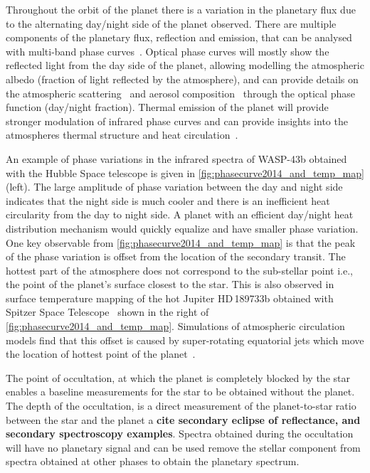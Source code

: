 Throughout the orbit of the planet there is a variation in the planetary flux due to the alternating day/night side of the planet observed.
There are multiple components of the planetary flux, reflection and emission, that can be analysed with multi-band phase curves~\citep[e.g.][]{knutson_characterizing_2009, esteves_optical_2013}.
Optical phase curves will mostly show the reflected light from the day side of the planet, allowing modelling the atmospheric albedo (fraction of light reflected by the atmosphere), and can provide details on the atmospheric scattering~\citep{madhusudhan_analytic_2012} and aerosol composition~\citep{oreshenko_optical_2016} through the optical phase function (day/night fraction).
Thermal emission of the planet will provide stronger modulation of infrared phase curves and can provide insights into the atmospheres thermal
structure and heat circulation~\citep{goodman_thermodynamics_2009, koll_temperature_2016}.

An example of phase variations in the infrared spectra of {WASP-43b} obtained with the Hubble Space telescope is given in \cref{fig:phasecurve2014_and_temp_map} (left).
The large amplitude of phase variation between the day and night side indicates that the night side is much cooler and there is an inefficient heat circularity from the day to night side.
A planet with an efficient day/night heat distribution mechanism would quickly equalize and have smaller phase variation.
One key observable from \cref{fig:phasecurve2014_and_temp_map} is that the peak of the phase variation is offset from the location of the secondary transit.
The hottest part of the atmosphere does not correspond to the sub-stellar point i.e., the point of the planet's surface closest to the star.
This is also observed in surface temperature mapping of the hot Jupiter HD\,189733b obtained with {Spitzer Space Telescope}~\citep{knutson_map_2007} shown in the right of \cref{fig:phasecurve2014_and_temp_map}.
Simulations of atmospheric circulation models find that this offset is caused by super-rotating equatorial jets which move the location of hottest point of the planet~\citep[e.g.][and references therein]{heng_atmospheric_2015}.

The point of occultation, at which the planet is completely blocked by the star enables a baseline measurements for the star to be obtained without the planet.
The depth of the occultation, is a direct measurement of the planet-to-star ratio between the star and the planet a \textbf{{cite secondary eclipse of reflectance, and secondary spectroscopy examples}}\todo{}.
Spectra obtained during the occultation will have no planetary signal and can be used remove the stellar component from spectra obtained at other phases to obtain the planetary spectrum.


